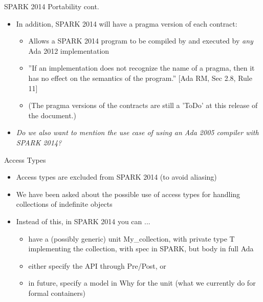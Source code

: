 \documentclass{beamer}
\begin{document}
\begin{frame}{SPARK 2014 Portability cont.}

  \begin{itemize}
  \item In addition, SPARK 2014 will have a pragma version of each contract:

    \begin{itemize}
    \item Allows a SPARK 2014 program to be compiled by and executed by \emph{any} Ada 2012 implementation

    \item ''If an implementation does not recognize the name of a pragma, then it has no effect on the semantics of the program.'' [Ada RM, Sec 2.8, Rule 11]

    \item (The pragma versions of the contracts are still a 'ToDo' at this release of the document.)

    \end{itemize}

  \item \emph{Do we also want to mention the use case of using an Ada 2005 compiler with SPARK 2014?}

\end{itemize}

\end{frame}

\begin{frame}{Access Types}

  \begin{itemize}
  \item Access types are excluded from SPARK 2014 (to avoid aliasing)
  \item We have been asked about the possible use of access types for handling collections of indefinite objects
  \item Instead of this, in SPARK 2014 you can ...

    \begin{itemize}
    \item have a (possibly generic) unit My\_collection, with private type T implementing the collection, with spec in SPARK, but body in full Ada
    \item either specify the API through Pre/Post, or
    \item in future, specify a model in Why for the unit (what we currently
      do for formal containers)
    \end{itemize}

  \end{itemize}

\end{frame}
\end{document}
